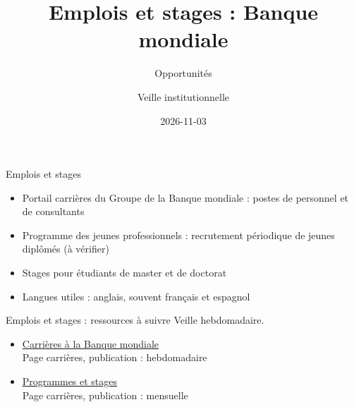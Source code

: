 \documentclass[aspectratio=169,11pt]{beamer}
\title{Emplois et stages : Banque mondiale}
\subtitle{Opportunités}
\author{Veille institutionnelle}
\date{2026-11-03}
\begin{document}
\begin{frame}\titlepage\end{frame}

\begin{frame}{Emplois et stages}
\begin{itemize}
\item Portail carrières du Groupe de la Banque mondiale : postes de personnel et de consultants
\item Programme des jeunes professionnels : recrutement périodique de jeunes diplômés (à vérifier)
\item Stages pour étudiants de master et de doctorat
\item Langues utiles : anglais, souvent français et espagnol
\end{itemize}
\end{frame}

\begin{frame}{Emplois et stages : ressources à suivre}
\small
Veille hebdomadaire.
\begin{itemize}
\item \href{https://www.worldbank.org/en/about/careers}{Carrières à la Banque mondiale}\\{\footnotesize Page carrières, publication : hebdomadaire}
\item \href{https://www.worldbank.org/en/about/careers/programs-and-internships}{Programmes et stages}\\{\footnotesize Page carrières, publication : mensuelle}
\end{itemize}
\end{frame}
\end{document}
